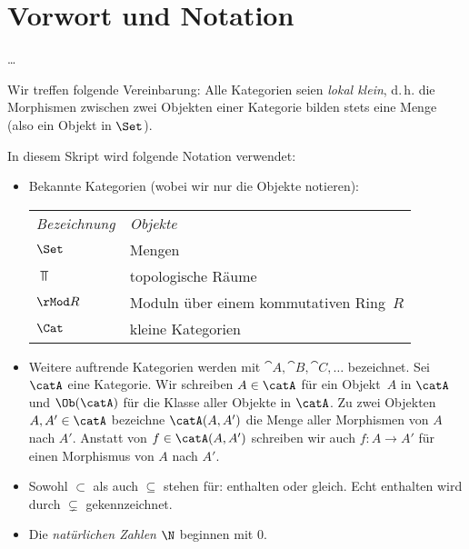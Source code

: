 
\chapter{Vorwort und Notation}
\ldots

\bigskip
Wir treffen folgende Vereinbarung:
Alle Kategorien seien \emph{lokal klein}, d.\,h. die Morphismen zwischen
zwei Objekten einer Kategorie bilden stets eine Menge (also ein Objekt
in $\Set$).

\bigskip
In diesem Skript wird folgende Notation verwendet:
\begin{itemize}
    \item
        Bekannte Kategorien (wobei wir nur die Objekte notieren):
        
        \hspace{6mm}
        \begin{tabular}{l@{\qquad}l}
            \emph{Bezeichnung} & \emph{Objekte}                         \\[2pt]
            $\Set$      &   Mengen                                      \\
            $\Top$      &   topologische Räume                          \\
            $\rMod R$   &   Moduln über einem kommutativen Ring~$R$      \\
            $\Cat$      &   kleine Kategorien
        \end{tabular}

    \item
        Weitere auftrende Kategorien werden mit $\cat A,\cat B, \cat C, \dots$
        bezeichnet. Sei $\catA$ eine Kategorie. Wir schreiben $A\in\catA$
        für ein Objekt~$A$ in $\catA$ und $\Ob(\catA)$ für die Klasse aller
        Objekte in $\catA$. Zu zwei Objekten $A,A'\in\catA$ bezeichne
        $\catA(A,A')$ die Menge aller Morphismen von $A$ nach $A'$.
        Anstatt von $f\in\catA(A,A')$ schreiben wir auch $f\colon A\to A'$ für
        einen Morphismus von $A$ nach $A'$.

    \item
        Sowohl $\subset$ als auch $\subseteq$ stehen für: enthalten oder gleich.
        Echt enthalten wird durch $\subsetneq$ gekennzeichnet.
    
    \item
        Die \emph{natürlichen Zahlen $\N$} beginnen mit $0$.
\end{itemize}
